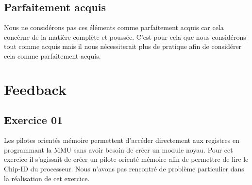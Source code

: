 \documentclass{ReportTemplate}
\begin{document}
\subsection{Parfaitement acquis}
Nous ne considérons pas ces éléments comme parfaitement acquis car cela concèrne
de la matière complète et poussée. C'est pour cela que nous considérons tout
comme acquis mais il nous nécessiterait plus de pratique afin de considérer cela
comme parfaitement acquis.
\section{Feedback}
\subsection{Exercice 01}
Les pilotes orientés mémoire permettent d'accéder directement aux
registres en programmant la MMU sans avoir besoin de créer un module noyau.
Pour cet exercice il s'agissait de créer un pilote orienté mémoire afin de
permettre de lire le Chip-ID du processeur. Nous n'avons pas rencontré de
problème particulier dans la réalisation de cet exercice.
\end{document}
